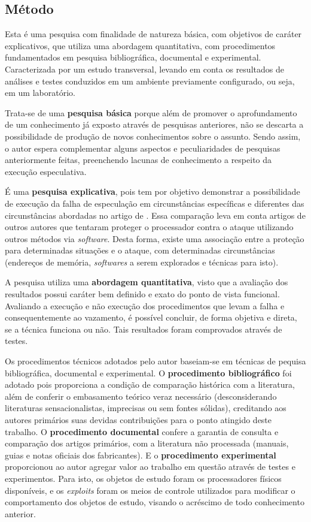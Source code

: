 \documentclass[
	article,			    %
	12pt,				    %
	oneside,			    %
	a4paper,			    %
	chapter=TITLE,		    %
	section=TITLE,		    %
	subsection=TITLE,	    %
	english,			    %
	brazil,				    %
	sumario=tradicional
]{abntex2}
\begin{document}
\subsection{Método}
Esta é uma pesquisa com finalidade de natureza básica, com objetivos de caráter explicativos, que utiliza uma abordagem quantitativa, com procedimentos fundamentados em pesquisa bibliográfica, documental e experimental. Caracterizada por um estudo transversal, levando em conta os resultados de análises e testes conduzidos em um ambiente previamente configurado, ou seja, em um laboratório.

Trata-se de uma \textbf{pesquisa básica} porque além de promover o aprofundamento de um conhecimento já exposto através de pesquisas anteriores, não se descarta a possibilidade de produção de novos conhecimentos sobre o assunto. Sendo assim, o autor espera complementar alguns aspectos e peculiaridades de pesquisas anteriormente feitas, preenchendo lacunas de conhecimento a respeito da execução especulativa.

É uma \textbf{pesquisa explicativa}, pois tem por objetivo demonstrar a possibilidade de execução da falha de especulação em circunstâncias específicas e diferentes das circunstâncias abordadas no artigo de . Essa comparação leva em conta artigos de outros autores que tentaram proteger o processador contra o ataque utilizando outros métodos via \emph{software}. Desta forma, existe uma associação entre a proteção para determinadas situações e o ataque, com determinadas circunstâncias (endereços de memória, \emph{softwares} a serem explorados e técnicas para isto).

A pesquisa utiliza uma \textbf{abordagem quantitativa}, visto que a avaliação dos resultados possui caráter bem definido e exato do ponto de vista funcional. Avaliando a execução e não execução dos procedimentos que levam a falha e consequentemente ao vazamento, é possível concluir, de forma objetiva e direta, se a técnica funciona ou não. Tais resultados foram comprovados através de testes.

Os procedimentos técnicos adotados pelo autor baseiam-se em técnicas de pequisa bibliográfica, documental e experimental. O \textbf{procedimento bibliográfico} foi adotado pois proporciona a condição de comparação histórica com a literatura, além de conferir o embasamento teórico veraz necessário (desconsiderando literaturas sensacionalistas, imprecisas ou sem fontes sólidas), creditando aos autores primários suas devidas contribuições para o ponto atingido deste trabalho. O \textbf{procedimento documental} confere a garantia de consulta e comparação dos artigos primários, com a literatura não processada (manuais, guias e notas oficiais dos fabricantes). E o \textbf{procedimento experimental} proporcionou ao autor agregar valor ao trabalho em questão através de testes e experimentos. Para isto, os objetos de estudo foram os processadores físicos disponíveis, e os \emph{exploits} foram os meios de controle utilizados para modificar o comportamento dos objetos de estudo, visando o acréscimo de todo conhecimento anterior.
\end{document}
